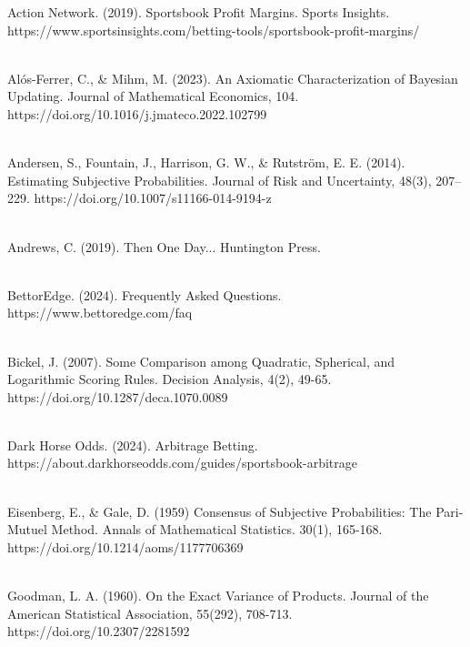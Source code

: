 \documentclass[sn-mathphys-num]{sn-jnl}
\theoremstyle{thmstyleone}%
\theoremstyle{thmstyletwo}%
\theoremstyle{thmstylethree}%
\begin{document}
\pagebreak
\begin{thebibliography}{9}

Action Network. (2019). Sportsbook Profit Margins. Sports Insights. https://www.sportsinsights.com/betting-tools/sportsbook-profit-margins/  \vspace{5pt}

\\Alós-Ferrer, C., \& Mihm, M. (2023). An Axiomatic Characterization of Bayesian Updating. Journal of Mathematical Economics, 104. https://doi.org/10.1016/j.jmateco.2022.102799 \vspace{5pt}

\\Andersen, S., Fountain, J., Harrison, G. W., \& Rutström, E. E. (2014). Estimating Subjective Probabilities. Journal of Risk and Uncertainty, 48(3), 207–229. https://doi.org/10.1007/s11166-014-9194-z \vspace{5pt}

\\Andrews, C. (2019). Then One Day... Huntington Press. \vspace{5pt}

\\BettorEdge. (2024). Frequently Asked Questions. https://www.bettoredge.com/faq \vspace{5pt}

\\Bickel, J. (2007). Some Comparison among Quadratic, Spherical, and Logarithmic Scoring Rules. Decision Analysis, 4(2), 49-65. https://doi.org/10.1287/deca.1070.0089 \vspace{5pt}

\\Dark Horse Odds. (2024). Arbitrage Betting. https://about.darkhorseodds.com/guides/sportsbook-arbitrage\vspace{5pt}

\\Eisenberg, E.,  \& Gale, D. (1959) Consensus of Subjective Probabilities: The Pari-Mutuel Method. Annals of Mathematical Statistics. 30(1), 165-168. https://doi.org/10.1214/aoms/1177706369 \vspace{5pt}
 
\\Goodman, L. A. (1960). On the Exact Variance of Products. Journal of the American Statistical Association, 55(292), 708-713. https://doi.org/10.2307/2281592 \vspace{5pt}


\end{thebibliography}
\end{document}
